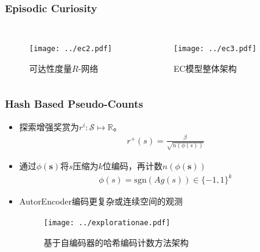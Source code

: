 \documentclass{beamer}
\begin{document}
\begin{CJK*}{GBK}{hei}
\begin{frame}\frametitle{Episodic Curiosity}
\begin{columns}
        \begin{figure}[htbp]
            \centering\texttt{[image: ../ec2.pdf]}
	    \caption{可达性度量$R$-网络}
        \end{figure}
        \begin{figure}[htbp]
            \centering\texttt{[image: ../ec3.pdf]}
	    \caption{EC模型整体架构}
        \end{figure}
\end{columns}
\end{frame}

\begin{frame}\frametitle{Hash Based Pseudo-Counts}
\begin{itemize}
\item 探索增强奖赏为$r^{i}: \mathcal{S} \mapsto \mathbb{R}$。
        \begin{align*}
            r^{+}(s)=\frac{\beta}{\sqrt{n(\phi(s))}}
        \end{align*}
\item 通过$\phi(\mathbf{s})$将$s$压缩为$k$位编码，再计数$n(\phi(\mathbf{s}))$
\begin{align*}
            \phi(s) = \text{sgn}(A g(s)) \in \{-1, 1\}^k
\end{align*}
\item AutorEncoder编码更复杂或连续空间的观测
\begin{figure}[htbp]
       \centering\texttt{[image: ../explorationae.pdf]}
	    \caption{基于自编码器的哈希编码计数方法架构\citep{Tang2017ExplorationAS}}
\end{figure}
\end{itemize}
\end{frame}


\end{CJK*}
\end{document}
